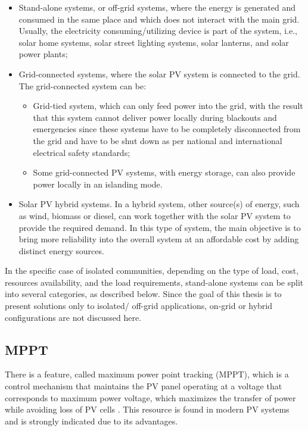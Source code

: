 \begin{itemize}
\item Stand-alone systems, or off-grid systems, where the energy is generated and consumed in the same place and which does not interact with the main grid. Usually, the electricity consuming/utilizing device is part of the system, i.e., solar home systems, solar street lighting systems, solar lanterns, and solar power plants; 
\item Grid-connected systems, where the solar PV system is connected to the grid. The grid-connected system can be: 
\begin{itemize}
\item Grid-tied system, which can only feed power into the grid, with the result that this system cannot deliver power locally during blackouts and emergencies since these systems have to be completely disconnected from the grid and have to be shut down as per national and international electrical safety standards;
\item Some grid-connected PV systems, with energy storage, can also provide power locally in an islanding mode. 
\end{itemize}
\item Solar PV hybrid systems. In a hybrid system, other source(s) of energy, such as wind, biomass or diesel, can work together with the solar PV system to provide the required demand. In this type of system, the main objective is to bring more reliability into the overall system at an affordable cost by adding distinct energy sources.
\end{itemize}
 
In the specific case of isolated communities, depending on the type of load, cost, resources availability, and the load requirements, stand-alone systems can be split into several categories, as described below. Since the goal of this thesis is to present solutions only to isolated/ off-grid applications, on-grid or hybrid configurations are not discussed here.

\subsection{MPPT} 

There is a feature, called maximum power point tracking (MPPT), which is a control mechanism that maintains the PV panel operating at a voltage that corresponds to maximum power voltage, which maximizes the transfer of power while avoiding loss of PV cells \cite{Pinho}. This resource is found in modern PV systems and is strongly indicated due to its advantages.

